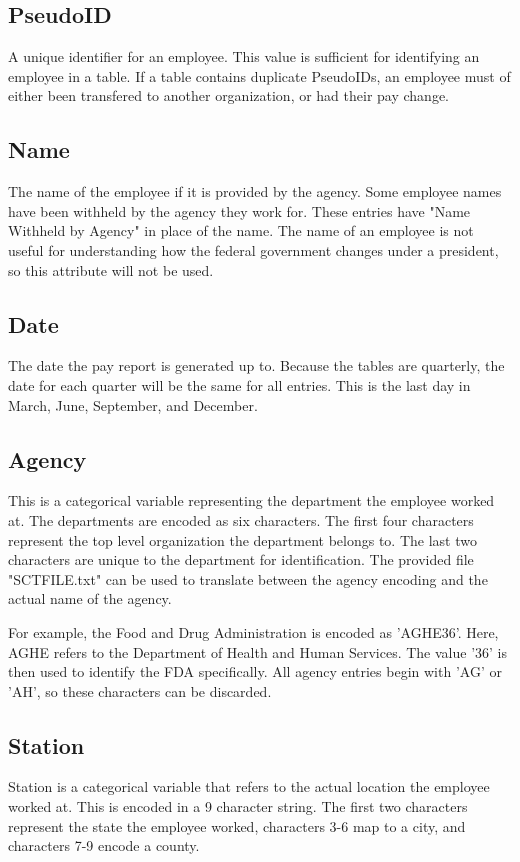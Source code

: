 \documentclass{article}
\begin{document}
    \subsection{PseudoID}
    A unique identifier for an employee. This value is sufficient for identifying an employee in a table. If a table contains duplicate PseudoIDs, an employee must of either been transfered to another organization, or had their pay change.

    \subsection{Name}
    The name of the employee if it is provided by the agency. Some employee names have been withheld by the agency they work for. These entries have "Name Withheld by Agency" in place of the name. The name of an employee is not useful for understanding how the federal government changes under a president, so this attribute will not be used.

    \subsection{Date}
    The date the pay report is generated up to. Because the tables are quarterly, the date for each quarter will be the same for all entries. This is the last day in March, June, September, and December.

    \subsection{Agency}
    This is a categorical variable representing the department the employee worked at. The departments are encoded as six characters. The first four characters represent the top level organization the department belongs to. The last two characters are unique to the department for identification. The provided file "SCTFILE.txt" can be used to translate between the agency encoding and the actual name of the agency.
    \par
    For example, the Food and Drug Administration is encoded as 'AGHE36'. Here, AGHE refers to the Department of Health and Human Services. The value '36' is then used to identify the FDA specifically. All agency entries begin with 'AG' or 'AH', so these characters can be discarded.

    \subsection{Station}
    Station is a categorical variable that refers to the actual location the employee worked at. This is encoded in a 9 character string. The first two characters represent the state the employee worked, characters 3-6 map to a city, and characters 7-9 encode a county.
\end{document}
